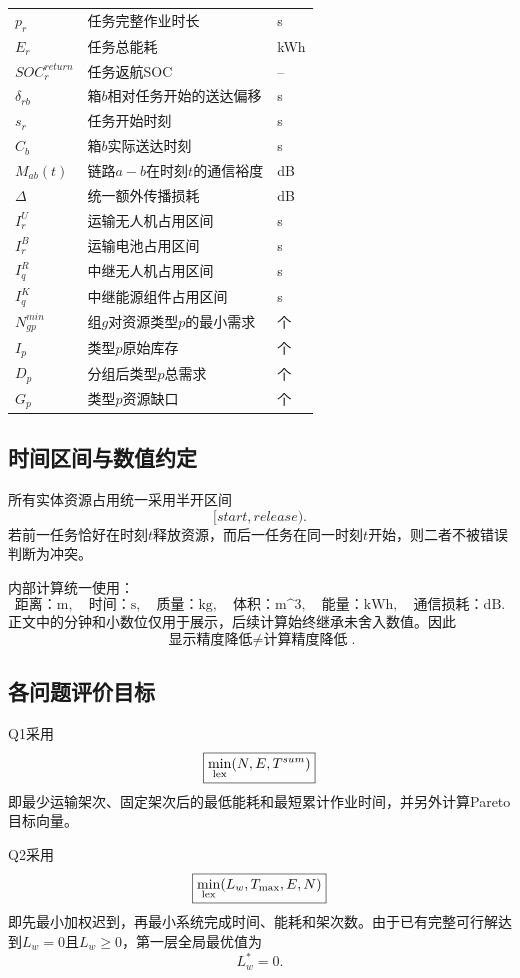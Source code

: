 \documentclass[UTF8,a4paper,12pt]{ctexart}
\begin{document}
\begin{longtable}{p{3cm}p{8.5cm}p{2cm}}
$p_r$ & 任务完整作业时长 & s\\
$E_r$ & 任务总能耗 & kWh\\
$SOC_r^{return}$ & 任务返航SOC & --\\
$\delta_{rb}$ & 箱$b$相对任务开始的送达偏移 & s\\
$s_r$ & 任务开始时刻 & s\\
$C_b$ & 箱$b$实际送达时刻 & s\\
$M_{ab}(t)$ & 链路$a-b$在时刻$t$的通信裕度 & dB\\
$\Delta$ & 统一额外传播损耗 & dB\\
$I_r^U$ & 运输无人机占用区间 & s\\
$I_r^B$ & 运输电池占用区间 & s\\
$I_q^R$ & 中继无人机占用区间 & s\\
$I_q^K$ & 中继能源组件占用区间 & s\\
$N_{gp}^{min}$ & 组$g$对资源类型$p$的最小需求 & 个\\
$I_p$ & 类型$p$原始库存 & 个\\
$D_p$ & 分组后类型$p$总需求 & 个\\
$G_p$ & 类型$p$资源缺口 & 个\\
\bottomrule
\end{longtable}

\subsection{时间区间与数值约定}

所有实体资源占用统一采用半开区间
\[
[start,release).
\]
若前一任务恰好在时刻$t$释放资源，而后一任务在同一时刻$t$开始，则二者不被错误判断为冲突。

内部计算统一使用：
\[
\text{距离：m},\quad
\text{时间：s},\quad
\text{质量：kg},\quad
\text{体积：m^3},\quad
\text{能量：kWh},\quad
\text{通信损耗：dB}.
\]
正文中的分钟和小数位仅用于展示，后续计算始终继承未舍入数值。因此
\[
\boxed{
\text{显示精度降低}
\neq
\text{计算精度降低}
}.
\]

\subsection{各问题评价目标}

Q1采用
\[
\boxed{
\min_{\rm lex}(N,E,T^{sum})
}
\]
即最少运输架次、固定架次后的最低能耗和最短累计作业时间，并另外计算Pareto目标向量。

Q2采用
\[
\boxed{
\min_{\rm lex}(L_w,T_{\max},E,N)
}
\]
即先最小加权迟到，再最小系统完成时间、能耗和架次数。由于已有完整可行解达到$L_w=0$且$L_w\ge0$，第一层全局最优值为
\[
L_w^*=0.
\]
\end{document}
